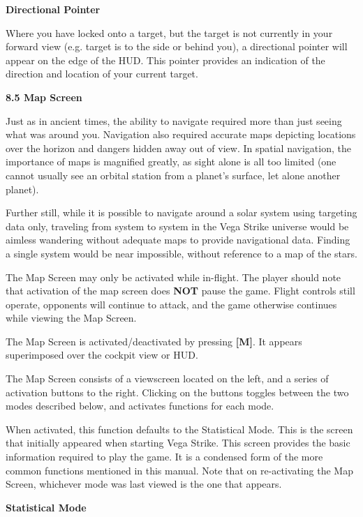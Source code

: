 \documentclass{article}
\begin{document}
\textbf{Directional Pointer }

Where you have locked onto a target, but the target is not currently in your forward view (e.g. target is to the side or behind you), a directional pointer will appear on the edge of the HUD. This pointer provides an indication of the direction and location of your current target. 

\textbf{}

\textbf{8.5 Map Screen }

Just as in ancient times, the ability to navigate required more than just seeing what was around you. Navigation also required accurate maps depicting locations over the horizon and dangers hidden away out of view. In spatial navigation, the importance of maps is magnified greatly, as sight alone is all too limited (one cannot usually see an orbital station from a planet's surface, let alone another planet). 

Further still, while it is possible to navigate around a solar system using targeting data only, traveling from system to system in the Vega Strike universe would be aimless wandering without adequate maps to provide navigational data. Finding a single system would be near impossible, without reference to a map of the stars. 

The Map Screen may only be activated while in-flight. The player should note that activation of the map screen does \textbf{NOT }pause the game. Flight controls still operate, opponents will continue to attack, and the game otherwise continues while viewing the Map Screen. 

The Map Screen is activated/deactivated by pressing \textbf{[M]}. It appears superimposed over the cockpit view or HUD. 

The Map Screen consists of a viewscreen located on the left, and a series of activation buttons to the right. Clicking on the buttons toggles between the two modes described below, and activates functions for each mode. 

When activated, this function defaults to the Statistical Mode. This is the screen that initially appeared when starting Vega Strike. This screen provides the basic information required to play the game. It is a condensed form of the more common functions mentioned in this manual. Note that on re-activating the Map Screen, whichever mode was last viewed is the one that appears. 

\textbf{}

\textbf{Statistical Mode }
\end{document}
